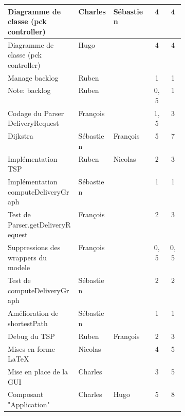 \begin{longtable}{|p{0.4\linewidth}|l|l|c|c|}
Diagramme de classe (pck controller) & Charles          & Sébastien   & 4                    & 4                   \\ \hline
Diagramme de classe (pck controller) & Hugo             &             & 4                    & 4                   \\ \hline
Manage backlog                       & Ruben            &             & 1                    & 1                   \\ \hline
Note: backlog                        & Ruben            &             & 0,5                  & 1                   \\ \hline
Codage du Parser DeliveryRequest     & François         &             & 1,5                  & 3                   \\ \hline
Dijkstra                             & Sébastien        & François    & 5                    & 7                   \\ \hline
Implémentation TSP                   & Ruben            & Nicolas     & 2                    & 3                   \\ \hline
Implémentation computeDeliveryGraph  & Sébastien        &             & 1                    & 1                   \\ \hline
Test de Parser.getDeliveryRequest    & François         &             & 2                    & 3                   \\ \hline
Suppressions des wrappers du modele  & François         &             & 0,5                  & 0,5                 \\ \hline
Test de computeDeliveryGraph         & Sébastien        &             & 2                    & 2                   \\ \hline
Amélioration de shortestPath         & Sébastien        &             & 1                    & 1                   \\ \hline
Debug du TSP                         & Ruben            & François    & 2                    & 3                   \\ \hline
Mises en forme LaTeX                 & Nicolas          &             & 4                    & 5                   \\ \hline
Mise en place de la GUI              & Charles          &             & 3                    & 5                   \\ \hline
Composant "Application"              & Charles          & Hugo        & 5                    & 8                   \\ \hline

\end{longtable}
